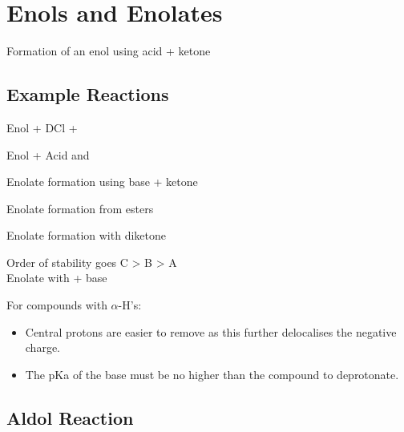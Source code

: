 \section{Enols and Enolates}


Formation of an enol using acid + ketone


\subsection{Example Reactions}

Enol + DCl + 


Enol +  Acid and 


Enolate formation using base + ketone


Enolate formation from esters


Enolate formation with diketone


Order of stability goes C > B > A\\

Enolate with  + base


For compounds with $\alpha$-H's:
\begin{itemize}
  \item Central protons are easier to remove as this further delocalises the
    negative charge.
  \item The pKa of the base must be no higher than the compound to deprotonate.
\end{itemize}

\subsection{Aldol Reaction}
